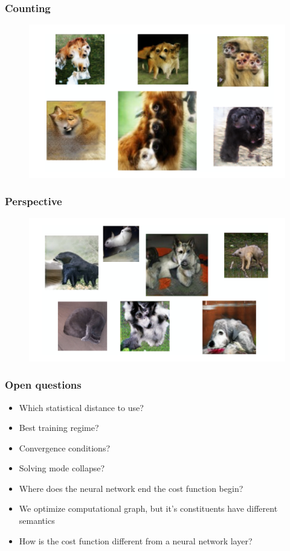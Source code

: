 \documentclass{Bredelebeamer}
\begin{document}
\begin{frame} \frametitle{Counting}
	\begin{figure}[h!]
	\centering
	\includegraphics[width=\textwidth]{gan_counting_problem.png}
	\end{figure}
\end{frame}

\begin{frame} \frametitle{Perspective}
	\begin{figure}[h!]
	\centering
	\includegraphics[width=\textwidth]{gan_perspective_problem.png}
	\end{figure}
\end{frame}

\begin{frame}
	\frametitle{Open questions}
	\begin{itemize}
		\item Which statistical distance to use?
		\item Best training regime?
		\item Convergence conditions?
		\item Solving mode collapse?
		\item Where does the neural network end the cost function begin?
		\item We optimize computational graph, but it's constituents have different semantics
		\item How is the cost function different from a neural network layer?
	\end{itemize}
\end{frame}
\end{document}

